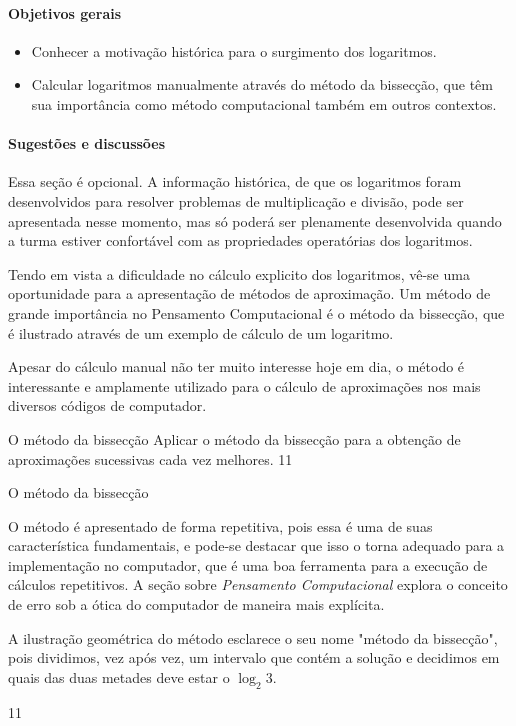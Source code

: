\clearpage
\def\currentcolor{session3}
\begin{texto}
{	
	\paragraph{Objetivos gerais}
	\begin{itemize}
	\item Conhecer a motivação histórica para o surgimento dos logaritmos.
	\item Calcular logaritmos manualmente através do método da bissecção, que têm sua importância como método computacional também em outros contextos.
	\end{itemize}

	\paragraph{Sugestões e discussões}
	Essa seção é opcional. A informação histórica, de que os logaritmos foram desenvolvidos para resolver problemas de multiplicação e divisão, pode ser apresentada nesse momento, mas só poderá ser plenamente desenvolvida quando a turma estiver confortável com as propriedades operatórias dos logaritmos.

	Tendo em vista a dificuldade no cálculo explicito dos logaritmos, vê-se uma oportunidade para a apresentação de métodos de aproximação. Um método de grande importância no Pensamento Computacional é o método da bissecção, que é ilustrado através de um exemplo de cálculo de um logaritmo.

	Apesar do cálculo manual não ter muito interesse hoje em dia, o método é interessante e amplamente utilizado para o cálculo de aproximações nos mais diversos códigos de computador.
}
\end{texto}

\begin{objectives}{O método da bissecção}
{
	Aplicar o método da bissecção para a obtenção de aproximações sucessivas cada vez melhores.
}{1}{1}
\end{objectives}
\begin{sugestions}{O método da bissecção}
{
	O método é apresentado de forma repetitiva, pois essa é uma de suas característica fundamentais, e pode-se destacar que isso o torna adequado para a implementação no computador, que é uma boa ferramenta para a execução de cálculos repetitivos. A seção sobre \textit{Pensamento Computacional} explora o conceito de erro sob a ótica do computador de maneira mais explícita.

	A ilustração geométrica do método esclarece o seu nome "método da bissecção", pois dividimos, vez após vez, um intervalo que contém a solução e decidimos em quais das duas metades deve estar o $\log_2 3$. 
}{1}{1}
\end{sugestions}

